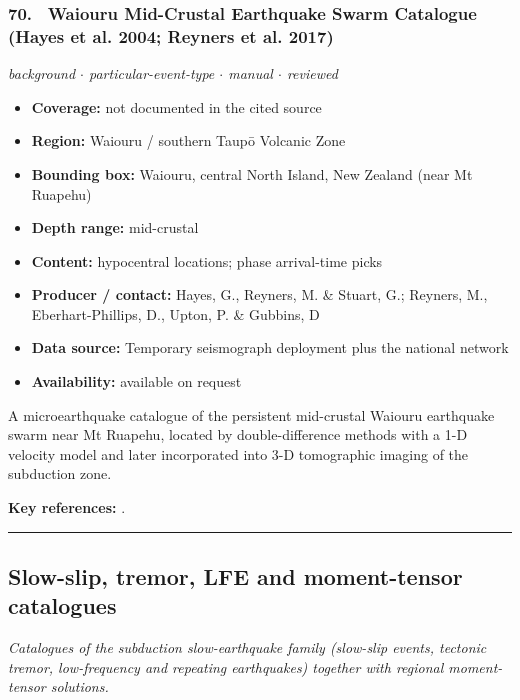 \documentclass[10pt,a4paper]{article}
\newcommand{\catentryrule}{\par\vspace{3pt}\noindent\textcolor{rulegrey}{\rule{\linewidth}{0.3pt}}\par\vspace{5pt}}
\newcommand{\kv}[2]{\item \textbf{#1:} #2}
\begin{document}
\subsubsection*{\hypertarget{c:70}{70.}~ Waiouru Mid-Crustal Earthquake Swarm Catalogue (Hayes et al. 2004; Reyners et al. 2017)}
{\small\itshape background $\cdot$ particular-event-type $\cdot$ manual $\cdot$ reviewed}\par\vspace{2pt}
\begin{itemize}[leftmargin=1.3em,itemsep=0.6pt,topsep=1pt,parsep=0pt]
\kv{Coverage}{not documented in the cited source}
\kv{Region}{Waiouru / southern Taupō Volcanic Zone}
\kv{Bounding box}{Waiouru, central North Island, New Zealand (near Mt Ruapehu)}
\kv{Depth range}{mid-crustal}
\kv{Content}{hypocentral locations; phase arrival-time picks}
\kv{Producer / contact}{Hayes, G., Reyners, M. \& Stuart, G.; Reyners, M., Eberhart-Phillips, D., Upton, P. \& Gubbins, D}
\kv{Data source}{Temporary seismograph deployment plus the national network}
\kv{Availability}{available on request}
\end{itemize}
\par\vspace{2pt}A microearthquake catalogue of the persistent mid-crustal Waiouru earthquake swarm near Mt Ruapehu, located by double-difference methods with a 1-D velocity model and later incorporated into 3-D tomographic imaging of the subduction zone.
\par\vspace{2pt}\textbf{Key references:} \cite{Hayes2004,Reyners2017}.
\catentryrule
\subsection{Slow-slip, tremor, LFE and moment-tensor catalogues}
\textit{Catalogues of the subduction slow-earthquake family (slow-slip events, tectonic tremor, low-frequency and repeating earthquakes) together with regional moment-tensor solutions.}\par\vspace{4pt}
\end{document}
